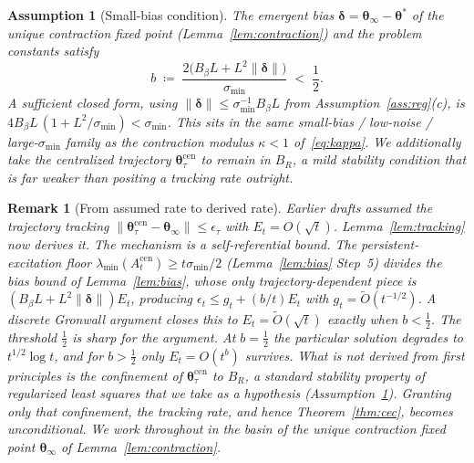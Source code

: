 \documentclass[11pt]{article}
\newtheorem{assumption}[theorem]{Assumption}
\newtheorem*{remark}{Remark}
\begin{document}
\begin{assumption}[Small-bias condition]\label{ass:smallbias}
The emergent bias $\bm{\delta}=\bm{\theta}_\infty-\bm{\theta}^{\!*}$ of
the unique contraction fixed point (Lemma~\ref{lem:contraction}) and the
problem constants satisfy
\[
b\;\coloneqq\;\frac{2\bigl(B_\beta L+L^2\|\bm{\delta}\|\bigr)}{\sigma_{\min}}
\;<\;\frac12 .
\]
A sufficient closed form, using $\|\bm{\delta}\|\leq\sigma_{\min}^{-1}B_\beta L$
from Assumption~\ref{ass:reg}(c), is
$4B_\beta L\,(1+L^2/\sigma_{\min})<\sigma_{\min}$.  This sits in the same
small-bias / low-noise / large-$\sigma_{\min}$ family as the contraction
modulus $\kappa<1$ of~\eqref{eq:kappa}.  We additionally take the
centralized trajectory $\bm{\theta}_\tau^{\mathrm{cen}}$ to remain in
$B_R$, a mild stability condition that is far weaker than positing a
tracking rate outright.
\end{assumption}

\begin{remark}[From assumed rate to derived rate]\label{rem:pol_conv}
Earlier drafts \emph{assumed} the trajectory tracking
$\|\bm{\theta}_\tau^{\mathrm{cen}}-\bm{\theta}_\infty\|\leq\epsilon_\tau$
with $E_t=O(\sqrt t)$.  Lemma~\ref{lem:tracking} now \emph{derives} it.
The mechanism is a self-referential bound. The persistent-excitation
floor $\lambda_{\min}(A_t^{\mathrm{cen}})\geq t\sigma_{\min}/2$
(Lemma~\ref{lem:bias} Step~5) divides the bias bound of
Lemma~\ref{lem:bias}, whose only trajectory-dependent piece is
$(B_\beta L+L^2\|\bm{\delta}\|)E_t$, producing
$\epsilon_t\leq g_t+(b/t)E_t$ with $g_t=\widetilde O(t^{-1/2})$.  A
discrete Gronwall argument closes this to $E_t=\widetilde O(\sqrt t)$
exactly when $b<\tfrac12$.  The threshold $\tfrac12$ is sharp for the
argument. At $b=\tfrac12$ the particular solution degrades to
$t^{1/2}\log t$, and for $b>\tfrac12$ only $E_t=O(t^b)$ survives.  What
is \emph{not} derived from first principles is the confinement of
$\bm{\theta}_\tau^{\mathrm{cen}}$ to $B_R$, a standard stability property
of regularized least squares that we take as a hypothesis
(Assumption~\ref{ass:smallbias}).  Granting only that confinement, the
tracking rate, and hence Theorem~\ref{thm:cec}, becomes unconditional.
We work throughout in the basin of the unique contraction fixed point
$\bm{\theta}_\infty$ of Lemma~\ref{lem:contraction}.
\end{remark}
\end{document}
